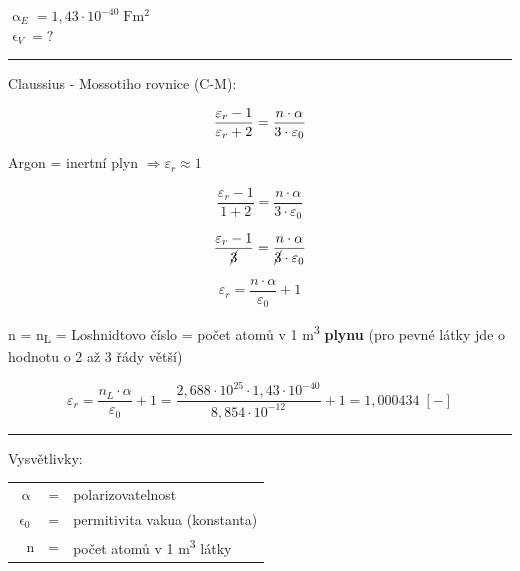 
$\upalpha_E = 1,43 \cdot 10^{-40} \; \si{\farad\meter\squared}$\\
$\upvarepsilon_V = ?$ \\
\noindent\rule{8cm}{0.4pt}

Claussius - Mossotiho rovnice (C-M):

\begin{equation*}
    \frac{\varepsilon_r - 1}{\varepsilon_r + 2} = \frac{n \cdot \alpha}{3 \cdot \varepsilon_0} \\
\end{equation*}

Argon = inertní plyn $\Rightarrow  \varepsilon_r \approx 1$

\begin{equation*}
    \frac{\varepsilon_r - 1}{1 + 2} = \frac{n \cdot \alpha}{3 \cdot \varepsilon_0}
\end{equation*}

\begin{equation*}
    \frac{\varepsilon_r - 1}{\cancel{3}} = \frac{n \cdot \alpha}{\cancel{3} \cdot \varepsilon_0}
\end{equation*}

\begin{equation*}
    \varepsilon_r= \frac{n \cdot \alpha}{\varepsilon_0} + 1
\end{equation*}

n = n\textsubscript{L} = Loshnidtovo číslo = počet atomů v 1 \si{\cubic\meter} \textbf{plynu} (pro pevné látky jde o hodnotu o 2 až 3 řády větší)

\begin{equation*}
    \varepsilon_r = \frac{n_L \cdot \alpha}{\varepsilon_0} + 1 = \frac{2,688 \cdot 10^{25} \cdot 1,43 \cdot 10^{-40}}{8,854 \cdot 10^{-12}} + 1 = 1,000434 \; [-]
\end{equation*}

\noindent\rule{8cm}{0.4pt}

Vysvětlivky:

\begin{tabular}{rcl}
    $\upalpha$ & = & polarizovatelnost \\
    $\upvarepsilon_0$ & = & permitivita vakua (konstanta) \\
    n & = & počet atomů v 1 \si{\cubic\meter} látky
\end{tabular}

